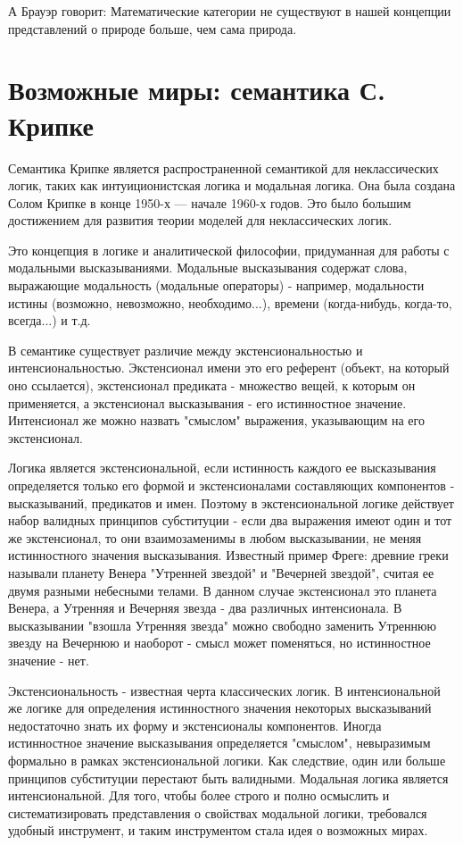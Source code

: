 \documentclass[12pt, specialist, subf, substylefile = spbu.rtx]{disser}
\begin{document}
А Брауэр говорит:
Математические категории не существуют в нашей концепции представлений о природе больше, чем сама природа.

\section{Возможные миры: семантика С. Крипке}
Семантика Крипке является распространенной семантикой для неклассических логик, таких как интуиционистская логика и модальная логика. Она была создана Солом Крипке в конце 1950-х — начале 1960-х годов. Это было большим достижением для развития теории моделей для неклассических логик.

Это концепция в логике и аналитической философии, придуманная для работы с модальными высказываниями. Модальные высказывания содержат слова, выражающие модальность (модальные операторы) - например, модальности истины (возможно, невозможно, необходимо...), времени (когда-нибудь, когда-то, всегда...) и т.д.

В семантике существует различие между экстенсиональностью и интенсиональностью. Экстенсионал имени это его референт (объект, на который оно ссылается), экстенсионал предиката - множество вещей, к которым он применяется, а экстенсионал высказывания - его истинностное значение. Интенсионал же можно назвать "смыслом" выражения, указывающим на его экстенсионал.

Логика является экстенсиональной, если истинность каждого ее высказывания определяется только его формой и экстенсионалами составляющих компонентов - высказываний, предикатов и имен. Поэтому в экстенсиональной логике действует набор валидных принципов субституции - если два выражения имеют один и тот же экстенсионал, то они взаимозаменимы в любом высказывании, не меняя истинностного значения высказывания. Известный пример Фреге: древние греки называли планету Венера "Утренней звездой" и "Вечерней звездой", считая ее двумя разными небесными телами. В данном случае экстенсионал это планета Венера, а Утренняя и Вечерняя звезда - два различных интенсионала. В высказывании "взошла Утренняя звезда" можно свободно заменить Утреннюю звезду на Вечернюю и наоборот - смысл может поменяться, но истинностное значение - нет.

Экстенсиональность - известная черта классических логик. В интенсиональной же логике для определения истинностного значения некоторых высказываний недостаточно знать их форму и экстенсионалы компонентов. Иногда истинностное значение высказывания определяется "смыслом", невыразимым формально в рамках экстенсиональной логики. Как следствие, один или больше принципов субституции перестают быть валидными. Модальная логика является интенсиональной. Для того, чтобы более строго и полно осмыслить и систематизировать представления о свойствах модальной логики, требовался удобный инструмент, и таким инструментом стала идея о возможных мирах.
\end{document}
